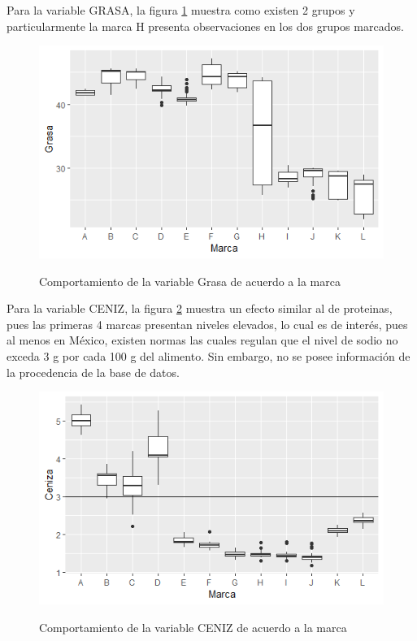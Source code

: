 \documentclass[12pt, letterpaper]{article}
\begin{document}
Para la variable GRASA, la figura \ref{i5} muestra como existen 2 grupos y particularmente la marca H presenta observaciones en los dos grupos marcados.\\

\begin{figure}[h]
\centering
\includegraphics[scale=1]{images/grasa.png} 
\label{i5}
\caption{Comportamiento de la variable Grasa de acuerdo a la marca}
\end{figure}

Para la variable CENIZ, la figura \ref{i6} muestra un efecto similar al de proteinas, pues las primeras 4 marcas presentan niveles elevados, lo cual es de interés, pues al menos en México, existen normas las cuales regulan que el nivel de sodio no exceda 3 g por cada 100 g del alimento. Sin embargo, no se posee información de la procedencia de la base de datos.\\

\begin{figure}[h]
\centering
\includegraphics[scale=1]{images/ceniz.png} 
\label{i6}
\caption{Comportamiento de la variable CENIZ de acuerdo a la marca}
\end{figure}
\end{document}
